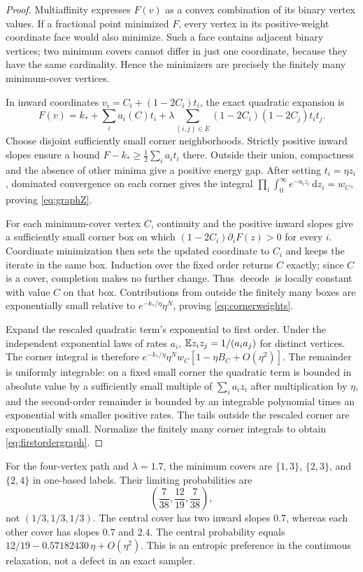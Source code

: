 \documentclass[11pt]{article}
\theoremstyle{definition}\newtheorem{definition}[theorem]{Definition}
\theoremstyle{remark}\newtheorem{remark}[theorem]{Remark}
\numberwithin{equation}{section}
\newcommand{\dd}{\,\mathrm d}\newcommand{\cA}{c_\alpha}\newcommand{\sg}{\operatorname{sigmoid}}
\newcommand{\1}{\mathbf 1}
\begin{document}
\begin{proof}
Multiaffinity expresses $F(v)$ as a convex combination of its binary vertex values. If a fractional point minimized $F$, every vertex in its positive-weight coordinate face would also minimize. Such a face contains adjacent binary vertices; two minimum covers cannot differ in just one coordinate, because they have the same cardinality. Hence the minimizers are precisely the finitely many minimum-cover vertices.

In inward coordinates $v_i=C_i+(1-2C_i)t_i$, the exact quadratic expansion is
\[
F(v)=k_*+\sum_i a_i(C)t_i+
\lambda\sum_{(i,j)\in E}(1-2C_i)(1-2C_j)t_it_j.
\]
Choose disjoint sufficiently small corner neighborhoods. Strictly positive inward slopes ensure a bound $F-k_*\ge\frac12\sum_i a_i t_i$ there. Outside their union, compactness and the absence of other minima give a positive energy gap. After setting $t_i=\eta z_i$, dominated convergence on each corner gives the integral $\prod_i\int_0^\infty e^{-a_i z_i}\dd z_i=w_C$, proving \eqref{eq:graphZ}.

For each minimum-cover vertex $C$, continuity and the positive inward slopes give a sufficiently small corner box on which $(1-2C_i)\partial_iF(z)>0$ for every $i$. Coordinate minimization then sets the updated coordinate to $C_i$ and keeps the iterate in the same box. Induction over the fixed order returns $C$ exactly; since $C$ is a cover, completion makes no further change. Thus $\operatorname{decode}$ is locally constant with value $C$ on that box. Contributions from outside the finitely many boxes are exponentially small relative to $e^{-k_*/\eta}\eta^N$, proving \eqref{eq:cornerweights}.

Expand the rescaled quadratic term's exponential to first order. Under the independent exponential laws of rates $a_i$, $\mathbb E z_i z_j=1/(a_i a_j)$ for distinct vertices. The corner integral is therefore
$e^{-k_*/\eta}\eta^Nw_C[1-\eta B_C+O(\eta^2)]$.
The remainder is uniformly integrable: on a fixed small corner the quadratic term is bounded in absolute value by a sufficiently small multiple of $\sum_i a_i z_i$ after multiplication by $\eta$, and the second-order remainder is bounded by an integrable polynomial times an exponential with smaller positive rates. The tails outside the rescaled corner are exponentially small. Normalize the finitely many corner integrals to obtain \eqref{eq:firstordergraph}.
\end{proof}
For the four-vertex path and $\lambda=1.7$, the minimum covers are $\{1,3\}$, $\{2,3\}$, and $\{2,4\}$ in one-based labels. Their limiting probabilities are
\begin{equation}
\left(\frac7{38},\frac{12}{19},\frac7{38}\right),\label{eq:pathweights}
\end{equation}
not $(1/3,1/3,1/3)$. The central cover has two inward slopes $0.7$, whereas each other cover has slopes $0.7$ and $2.4$. The central probability equals
$12/19-0.57182430\,\eta+O(\eta^2)$. This is an entropic preference in the continuous relaxation, not a defect in an exact sampler.
\end{document}
